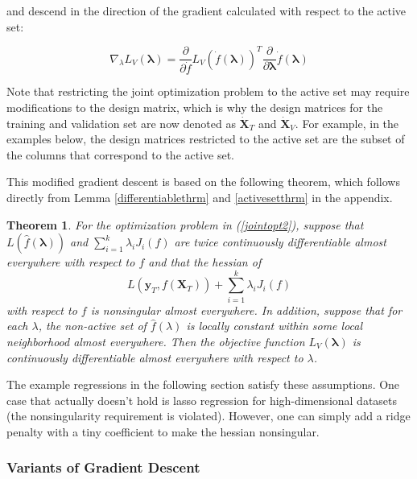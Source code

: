 \documentclass[10pt,letterpaper]{article}
\newtheorem{theorem}{Theorem}
\begin{document}
and descend in the direction of the gradient calculated with respect to the active set:

\begin{equation}
\nabla_\lambda L_V(\boldsymbol{\lambda}) = \frac{\partial}{\partial \dot f} L_V(\dot f(\boldsymbol{\lambda}))^T \frac{\partial}{\partial \boldsymbol{\lambda}} \dot f(\boldsymbol{\lambda})
\end{equation}

Note that restricting the joint optimization problem to the active set may require modifications to the design matrix, which is why the design matrices for the training and validation set are now denoted as $\dot{\boldsymbol{X}}_T$ and $\dot{\boldsymbol{X}}_V$. For example, in the examples below, the design matrices restricted to the active set are the subset of the columns that correspond to the active set.

This modified gradient descent is based on the following theorem, which follows directly from Lemma \ref{differentiablethrm} and \ref{activesetthrm} in the appendix.

\begin{theorem}
For the optimization problem in (\ref{jointopt2}), suppose that $L(\hat f(\boldsymbol{\lambda}))$ and
$\sum\limits_{i=1}^k \lambda_i J_i(f)$ are twice continuously differentiable almost everywhere with respect to $f$ and that the hessian of
\begin{equation}
L(\boldsymbol{y}_T, f (\boldsymbol{X}_T)) + \sum\limits_{i=1}^k \lambda_i J_i(f)
\end{equation}
with respect to $f$ is nonsingular almost everywhere. In addition, suppose that for each $\lambda$, the non-active set of $\hat f(\lambda)$ is locally constant within some local neighborhood almost everywhere. Then the objective function $L_V(\boldsymbol{\lambda})$ is continuously differentiable almost everywhere with respect to $\lambda$.
\label{thethrm}
\end{theorem}

The example regressions in the following section satisfy these assumptions. One case that actually doesn't hold is lasso regression for high-dimensional datasets (the nonsingularity requirement is violated). However, one can simply add a ridge penalty with a tiny coefficient to make the hessian nonsingular.

\subsubsection{Variants of Gradient Descent}
\end{document}
